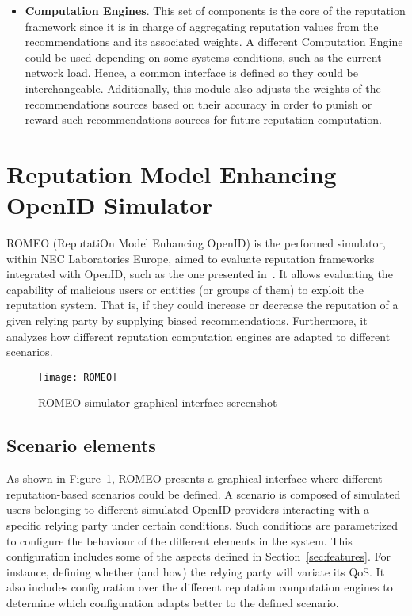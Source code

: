 \documentclass{llncs}
\begin{document}
\begin{itemize}
\item \textbf{Computation Engines}. This set of components is the core of the reputation framework since it is in charge of aggregating reputation values from the recommendations and its associated weights. A different Computation Engine could be used depending on some systems conditions, such as the current network load. Hence, a common interface is defined so they could be interchangeable. Additionally, this module also adjusts the weights of the recommendations sources based on their accuracy in order to punish or reward such recommendations sources for future reputation computation.

\end{itemize}

\section{Reputation Model Enhancing OpenID Simulator}\label{sec:romeo}

ROMEO (ReputatiOn Model Enhancing OpenID) is the performed simulator, within NEC Laboratories Europe, aimed to evaluate reputation frameworks integrated with OpenID, such as the one presented in~\cite{idm-trm:2011:gomez-marmol:atc}. It allows evaluating the capability of malicious users or entities (or groups of them) to exploit the reputation system. That is, if they could increase or decrease the reputation of a given relying party by supplying biased recommendations. Furthermore, it analyzes how different reputation computation engines are adapted to different scenarios.

 \begin{figure}[!h]
   \centering
   \texttt{[image: ROMEO]}
   \caption{ROMEO simulator graphical interface screenshot}
   \label{fig:romeo}
 \end{figure}

\subsection{Scenario elements}

As shown in Figure~\ref{fig:romeo}, ROMEO presents a graphical interface where different reputation-based scenarios could be defined. A scenario is composed of simulated users belonging to different simulated OpenID providers interacting with a specific relying party under certain conditions. Such conditions are parametrized to configure the behaviour of the different elements in the system. This configuration includes some of the aspects defined in Section~\ref{sec:features}. For instance, defining whether (and how) the relying party will variate its QoS. It also includes configuration over the different reputation computation engines to determine which configuration adapts better to the defined scenario.
 
\end{document}
